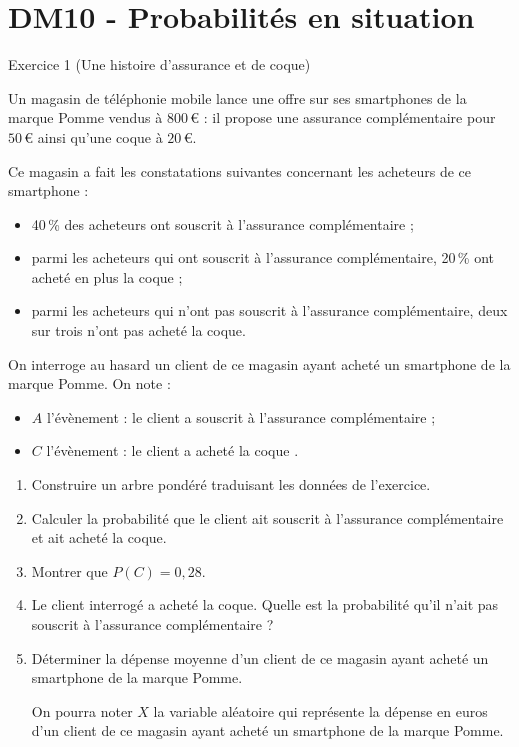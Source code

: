 \documentclass[a4paper,11pt]{article}
\author{Pierquet}
\title{\nomfichier}
\begin{document}
\pagestyle{fancy}

\thispagestyle{entetedm}

\part{DM10 - Probabilités en situation}

\medskip

\begin{blocexo}Exercice 1 \dotfill{}(Une histoire d'assurance et de coque)\end{blocexo}

\smallskip

Un magasin de téléphonie mobile lance une offre sur ses smartphones de la marque Pomme vendus à $800$\,€ : il propose une assurance complémentaire pour $50$\,€ ainsi qu'une coque à $20$\,€.

Ce magasin a fait les constatations suivantes concernant les acheteurs de ce smartphone :

\begin{itemize}
	\item 40\,\% des acheteurs ont souscrit à l'assurance complémentaire ;
	\item parmi les acheteurs qui ont souscrit à l'assurance complémentaire, 20\,\% ont acheté en plus la coque ;
	\item parmi les acheteurs qui n'ont pas souscrit à l'assurance complémentaire, deux sur trois n'ont pas acheté la coque.
\end{itemize}

On interroge au hasard un client de ce magasin ayant acheté un smartphone de la marque Pomme. On note :

\begin{itemize}
	\item $A$ l'évènement : \og le client a souscrit à l'assurance complémentaire \fg{} ;
	\item $C$ l'évènement : \og le client a acheté la coque \fg.
\end{itemize}
%
\begin{enumerate}
	\item Construire un arbre pondéré traduisant les données de l’exercice.
	\item Calculer la probabilité que le client ait souscrit à l'assurance complémentaire et ait acheté la coque.
	\item Montrer que $P(C) = 0,28$.
	\item Le client interrogé a acheté la coque. Quelle est la probabilité qu'il n'ait pas souscrit à l'assurance complémentaire ? 
	\item Déterminer la dépense moyenne d'un client de ce magasin ayant acheté un smartphone de la marque Pomme.
	
	{On pourra noter $X$ la variable aléatoire qui représente la dépense en euros d'un client de ce magasin ayant acheté un smartphone de la marque Pomme.}
\end{enumerate}
\end{document}
